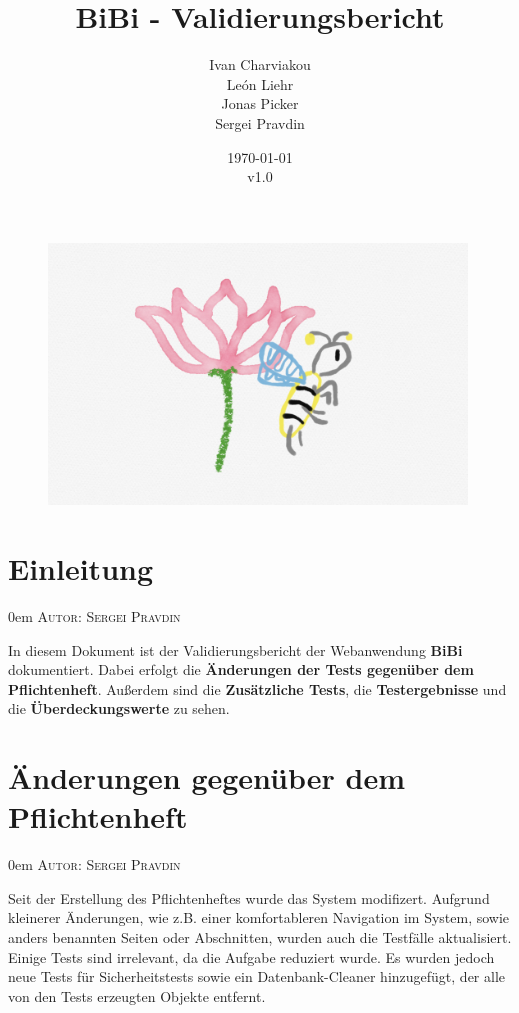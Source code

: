 \documentclass{article}
\title{BiBi - Validierungsbericht}
\date{\today\\v1.0}
\author{
	Ivan Charviakou\\
	León Liehr\\
	Jonas Picker\\
	Sergei Pravdin
}
\makeatletter
\newcommand{\sectionauthor}[1]{
	{\parindent 0em \large \scshape Autor: #1 \par \nobreak \vspace*{1em}}
	\@afterheading
}
\makeatother
\begin{document}
\maketitle
\begin{figure}[H]
	\centering
	\includegraphics[width = 30em]{Logo}
\end{figure}
\newpage
\tableofcontents
\newpage

\section{Einleitung}
\sectionauthor{Sergei Pravdin}
In diesem Dokument ist der Validierungsbericht der Webanwendung \textbf{BiBi} dokumentiert. Dabei erfolgt die \textbf{Änderungen der Tests gegenüber dem Pflichtenheft}. Außerdem sind die \textbf{Zusätzliche Tests}, die \textbf{Testergebnisse} und die \textbf{Überdeckungswerte} zu sehen.


\section{Änderungen gegenüber dem Pflichtenheft}
\sectionauthor{Sergei Pravdin}

Seit der Erstellung des Pflichtenheftes wurde das System modifizert. Aufgrund kleinerer Änderungen, wie z.B. einer komfortableren Navigation im System, sowie anders benannten Seiten oder Abschnitten, wurden auch die Testfälle aktualisiert. Einige Tests sind irrelevant, da die Aufgabe reduziert wurde. Es wurden jedoch neue Tests für Sicherheitstests sowie ein Datenbank-Cleaner hinzugefügt, der alle von den Tests erzeugten Objekte entfernt.
\end{document}
